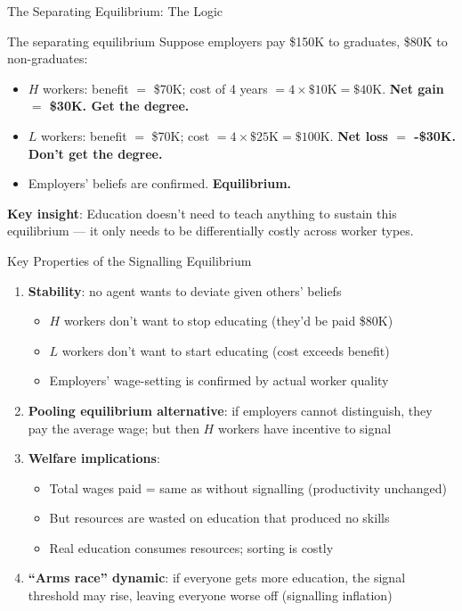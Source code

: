\documentclass[aspectratio=169, 12pt]{beamer}
\begin{document}
\begin{frame}{The Separating Equilibrium: The Logic}
  \begin{block}{The separating equilibrium}
    \small Suppose employers pay \$150K to graduates, \$80K to non-graduates:
    \begin{itemize}
      \item $H$ workers: benefit $=$ \$70K; cost of 4 years $= 4\times\$10\text{K} = \$40\text{K}$.
            \textbf{Net gain $=$ \$30K. Get the degree.}
      \item $L$ workers: benefit $=$ \$70K; cost $= 4\times\$25\text{K} = \$100\text{K}$.
            \textbf{Net loss $=$ -\$30K. Don't get the degree.}
      \item Employers' beliefs are confirmed. \textbf{Equilibrium.}
    \end{itemize}
  \end{block}
  \vspace{0.3em}
  \small \textbf{Key insight}: Education doesn't need to teach anything to sustain this equilibrium
  --- it only needs to be differentially costly across worker types.
\end{frame}

\begin{frame}{Key Properties of the Signalling Equilibrium}
  \small
  \begin{enumerate}
    \item \textbf{Stability}: no agent wants to deviate given others' beliefs
    \begin{itemize}
      \item $H$ workers don't want to stop educating (they'd be paid \$80K)
      \item $L$ workers don't want to start educating (cost exceeds benefit)
      \item Employers' wage-setting is confirmed by actual worker quality
    \end{itemize}
    \item \textbf{Pooling equilibrium alternative}: if employers cannot distinguish, they pay
          the average wage; but then $H$ workers have incentive to signal
    \item \textbf{Welfare implications}:
    \begin{itemize}
      \item Total wages paid = same as without signalling (productivity unchanged)
      \item But resources are wasted on education that produced no skills
      \item Real education consumes resources; sorting is costly
    \end{itemize}
    \item \textbf{``Arms race'' dynamic}: if everyone gets more education, the signal
          threshold may rise, leaving everyone worse off (signalling inflation)
  \end{enumerate}
\end{frame}
\end{document}
